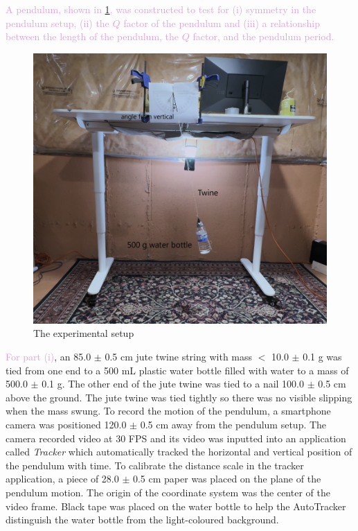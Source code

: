 \documentclass[notitlepage, twocolumn, 12pt]{article}
\begin{document}
    \textcolor{Plum}{A pendulum, shown in \cref{fig:setup}, was constructed to test for (i) symmetry in the pendulum setup, (ii) the $Q$ factor of the pendulum and (iii) a relationship between the length of the pendulum, the $Q$ factor, and the pendulum period.}
    \begin{figure}[H]
        \includegraphics[width=\linewidth]{temp.png}
        \caption{The experimental setup}
        \label{fig:setup}
    \end{figure}
    \textcolor{Plum}{For part (i)}, an 85.0 $\pm$ \textcolor{WildStrawberry}{0.5} cm jute twine string with mass $<$ 10.0 $\pm$ 0.1 g was tied from one end to a 500 mL plastic water bottle filled with water to a mass of \textcolor{WildStrawberry}{500.0} $\pm$ 0.1 g. The other end of the jute twine was tied to a nail 100.0 $\pm$ \textcolor{WildStrawberry}{0.5 cm} above the ground. The jute twine was tied tightly so there was no visible slipping when the mass swung. To record the motion of the pendulum, a smartphone camera was positioned 120.0 $\pm$ \textcolor{WildStrawberry}{0.5 cm} away from the pendulum setup. The camera recorded video at 30 FPS and its video was inputted into an application called \textit{Tracker} which automatically tracked the horizontal and vertical position of the pendulum with time. To calibrate the distance scale in the tracker application, a piece of 28.0 $\pm$ 0.5 cm paper was placed on the plane of the pendulum motion. The origin of the coordinate system was the center of the video frame. Black tape was placed on the water bottle to help the AutoTracker distinguish the water bottle from the light-coloured background. 
\end{document}
